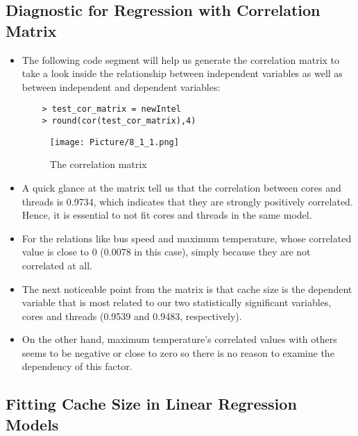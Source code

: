 \documentclass[a4paper]{article}
\begin{document}
\subsection{Diagnostic for Regression with Correlation Matrix}
\begin{itemize}
    \item[] The following code segment will help us generate the correlation matrix to take a look inside the relationship between independent variables as well as between independent and dependent variables:
    \begin{lstlisting}
    > test_cor_matrix = newIntel
    > round(cor(test_cor_matrix),4)
    \end{lstlisting}
    \begin{figure}[H]
        \centering
        \texttt{[image: Picture/8\_1\_1.png]}
        \caption{The correlation matrix}
        \label{8.2.1}
    \end{figure}
    
    \item[] A quick glance at the matrix tell us that the correlation between cores and threads is 0.9734, which indicates that they are strongly positively correlated. Hence, it is essential to not fit cores and threads in the same model.
    
    \item[] For the relations like bus speed and maximum temperature, whose correlated value is close to 0 (0.0078 in this case), simply because they are not correlated at all.
    
    \item[] The next noticeable point from the matrix is that cache size is the dependent variable that is most related to our two statistically significant variables, cores and threads (0.9539 and 0.9483, respectively).
    
    \item[] On the other hand, maximum temperature's correlated values with others seems to be negative or close to zero so there is no reason to examine the dependency of this factor.
\end{itemize}

\subsection{Fitting Cache Size in Linear Regression Models}
\end{document}
